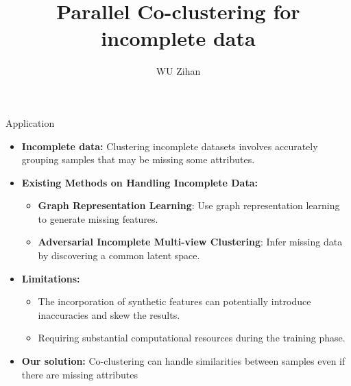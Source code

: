 \documentclass{beamer}
\title{Parallel Co-clustering for incomplete data}
\author{WU Zihan}
\begin{document}
\maketitle

\begin{frame}{Application}
    \begin{itemize}
        \item \textbf{Incomplete data:} Clustering incomplete datasets involves accurately grouping samples that may be missing some attributes.
        \item \textbf{Existing Methods on Handling Incomplete Data:}
        \begin{itemize}
            \item \textbf{Graph Representation Learning}\footnotemark[1]: Use graph representation learning to generate missing features.
            \item \textbf{Adversarial Incomplete Multi-view Clustering}\footnotemark[2]: Infer missing data by discovering a common latent space.
        \end{itemize}
        \item \textbf{Limitations:}
        \begin{itemize}
            \item The incorporation of synthetic features can potentially introduce inaccuracies and skew the results.
            \item Requiring substantial computational resources during the training phase.
        \end{itemize}
        \item \textbf{Our solution:} Co-clustering can handle similarities between samples even if there are missing attributes
    \end{itemize}

\end{frame}
\end{document}
